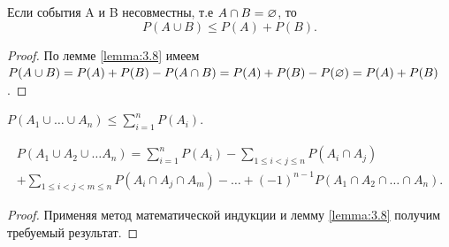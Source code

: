 \begin{consq}
	Если события A и B несовместны, т.е $A\cap B=\varnothing$, то 
\begin{equation*}
		P(A\cup B)\leqslant P(A)+P(B).
\end{equation*}
\end{consq}

\begin{proof}
	По лемме \ref{lemma:3.8} имеем $P(A\cup B)=P(A)+P(B)-P(A\cap B)=P(A)+P(B)-P(\varnothing)=P(A)+P(B)$.
\end{proof}

\begin{consq}
	$P(A_1\cup\dots\cup A_n)\leqslant\sum\limits^n_{i=1}P(A_i)$.
\end{consq}	
\begin{theorem}
\label{t:3.12}
\begin{gather*}
	P(A_1\cup A_2\cup\dots A_n)
	=\sum\limits_{i=1}^n P(A_i)
	-\sum\limits_{1\leqslant i<j	\leqslant n} P(A_i\cap A_j)\\
	+ \sum\limits_{1\leqslant i<j<m\leqslant n}P(A_i\cap A_j \cap A_m)-
	\dots
	+(-1)^{n-1}P(A_1\cap A_2\cap\dots\cap A_n).
\end{gather*}
\begin{proof}
	Применяя метод математической индукции и лемму \ref{lemma:3.8}
получим требуемый результат.
\end{proof}
\end{theorem}
